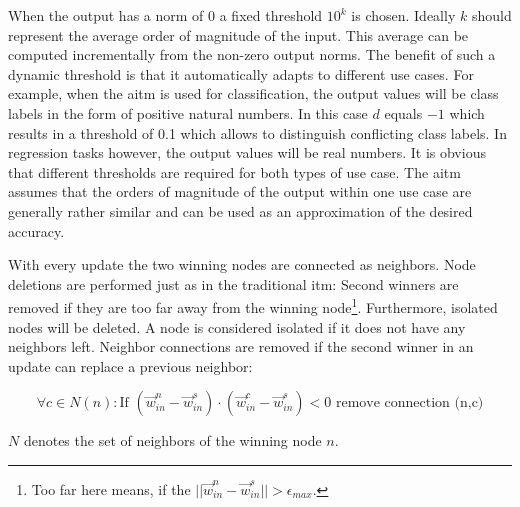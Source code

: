 When the output has a norm of $0$ a fixed threshold $10^k$ is chosen. Ideally $k$ should represent the average order of magnitude of the input. This average can be computed incrementally from the non-zero output norms. The benefit of such a dynamic threshold is that it automatically adapts to different use cases. For example, when the \gls{aitm} is used for classification, the output values will be class labels in the form of positive natural numbers. In this case $d$ equals $-1$ which results in a threshold of 0.1 which allows to distinguish conflicting class labels.
In regression tasks however, the output values will be real numbers. It is obvious that different thresholds are required for both types of use case. The \gls{aitm} assumes that the orders of magnitude of the output within one use case are generally rather similar and can be used as an approximation of the desired accuracy.

With every update the two winning nodes are connected as neighbors. Node deletions are performed just as in the traditional \gls{itm}: Second winners are removed if they are too far away from the winning node\footnote{Too far here means, if the $||\vec{w}^n_{in} - \vec{w}^s_{in}|| > \epsilon_{max}$. }. Furthermore, isolated nodes will be deleted. A node is considered isolated if it does not have any neighbors left. Neighbor connections are removed if the second winner in an update can replace a previous neighbor:

\begin{equation}
\forall c \in N(n): \text{If~} (\vec{w}^n_{in}-\vec{w}^s_{in}) \cdot (\vec{w}^c_{in}-\vec{w}^s_{in}) < 0 \text{~remove connection (n,c)}
\end{equation}

$N$ denotes the set of neighbors of the winning node $n$.

